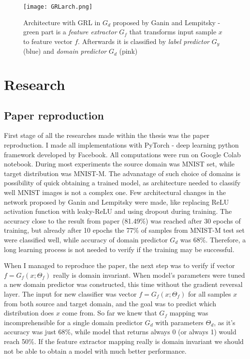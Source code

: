\documentclass{article}
\begin{document}
\begin{figure}%
    \centering
    \texttt{[image: GRLarch.png]}%
    \caption{Architecture with GRL in $G_{d}$ proposed by Ganin and Lempitsky - green part is a \textit{feature extractor} $G_{f}$ that transforms input sample $x$ to feature vector $f$. Afterwards it is classified by \textit{label predictor} $G_{y}$ (blue) and \textit{domain predictor} $G_{d}$ (pink)}
    \label{fig:GRLarch}%
\end{figure}

\section{Research}
\subsection{Paper reproduction}
First stage of all the researches made within the thesis was the paper reproduction. I made all implementations with PyTorch - deep learning python framework developed by Facebook. All computations were run on Google Colab notebook. During most experiments the source domain was MNIST set, while target distribution was MNIST-M. The advanatage of such choice of domains is possibility of quick obtaining a trained model, as architecture needed to classify well MNIST images is not a complex one. Few architectural changes in the network proposed by Ganin and Lempitsky were made, like replacing ReLU activation function with leaky-ReLU and using dropout during training. The accuracy close to the result from paper (81.49\%) was reached after 30 epochs of training, but already after 10 epochs the 77\% of samples from MNIST-M test set were classified well, while accuracy of domain predictor $G_{d}$ was 68\%. Therefore, a long learning process is not needed to verify if the training may be successful.
\par
When I managed to reproduce the paper, the next step was to verify if vector $f=G_{f}(x;\Theta_{f})$ really is domain invariant. When model's parameters were tuned a new domain predictor was constructed, this time without the gradient reversal layer. The input for new classifier was  vector $f = G_{f}(x;\Theta_{f})$ for all samples $x$ from both source and target domain, and the goal was to predict which distribution does $x$ come from. So far we knew that $G_{f}$ mapping was incomprehensible for a single domain predictor $G_{d}$ with parameters $\Theta_{d}$, as it's accuracy was just 68\%, while model that returns always 0 (or always 1) would reach 50\%. If the feature extractor mapping really is domain invariant we should not be able to obtain a model with much better performance.
\end{document}
